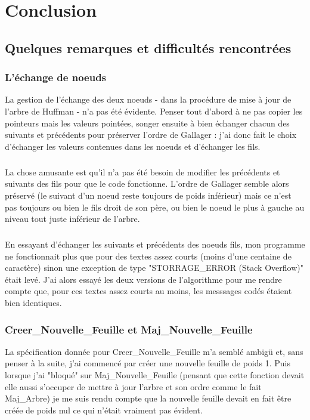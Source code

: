 \documentclass{book}
\begin{document}
\chapter{Conclusion}

\section{Quelques remarques et difficultés rencontrées}

\subsection{L'échange de noeuds}
La gestion de l'échange des deux noeuds - dans la procédure de mise à jour de l'arbre de Huffman - n'a pas été évidente. Penser tout d'abord à ne pas copier les pointeurs mais les valeurs pointées, songer ensuite à bien échanger chacun des suivants et précédents pour préserver l'ordre de Gallager : j'ai donc fait le choix d'échanger les valeurs contenues dans les noeuds et d'échanger les fils.
\paragraph{}
La chose amusante est qu'il n'a pas été besoin de modifier les précédents et suivants des fils pour que le code fonctionne. L'ordre de Gallager semble alors préservé (le suivant d'un noeud reste toujours de poids inférieur) mais ce n'est pas toujours ou bien le fils droit de son père, ou bien le noeud le plus à gauche au niveau tout juste inférieur de l'arbre.
\paragraph{}
En essayant d'échanger les suivants et précédents des noeuds fils, mon programme ne fonctionnait plus que pour des textes assez courts (moins d'une centaine de caractère) sinon une exception de type "STORRAGE\_ERROR (Stack Overflow)" était levé. J'ai alors essayé les deux versions de l'algorithme pour me rendre compte que, pour ces textes assez courts au moins, les messsages codés étaient bien identiques.

\subsection{Creer\_Nouvelle\_Feuille et Maj\_Nouvelle\_Feuille}
La spécification donnée pour Creer\_Nouvelle\_Feuille m'a semblé ambig\"u et, sans penser à la suite, j'ai commencé par créer une nouvelle feuille de poids 1. Puis lorsque j'ai "bloqué" sur Maj\_Nouvelle\_Feuille (pensant que cette fonction devait elle aussi s'occuper de mettre à jour l'arbre et son ordre comme le fait Maj\_Arbre) je me suis rendu compte que la nouvelle feuille devait en fait \^{e}tre créée de poids nul ce qui n'était vraiment pas évident.
\end{document}

